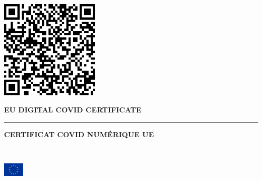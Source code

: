 \documentclass[a4paper,11pt]{article}
\begin{document}
\thispagestyle{empty}

\begin{minipage}{47.98mm}
  \includegraphics[height=47.98mm]{qrcode.png}
\end{minipage}
\begin{minipage}{3mm}
\end{minipage}
\begin{minipage}{28.62mm}
  \begin{center}

    {\scriptsize \bfseries \sffamily EU DIGITAL COVID CERTIFICATE}
    
    \rule[0mm]{28.62mm}{0.6mm}

    {\scriptsize \bfseries \sffamily CERTIFICAT COVID NUMÉRIQUE UE}
    
    ~

    \includegraphics[width=10mm]{euFlag.png}

  \end{center}
\end{minipage}
\end{document}
